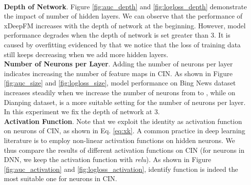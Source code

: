  \\\indent\textbf{Depth of Network}. Figure \ref{fig:auc_depth} and \ref{fig:logloss_depth} demonstrate the impact of number of hidden layers. We can observe that the performance of xDeepFM increases with the depth of network at the beginning. However, model performance degrades when the depth of network is set greater than 3. It is caused by overfitting evidenced by that we notice that the loss of training data still keeps decreasing when we add more hidden layers.
 \\\indent\textbf{Number of Neurons per Layer}. Adding the number of neurons per layer indicates increasing the number of feature maps in CIN. As shown in Figure \ref{fig:auc_size} and \ref{fig:logloss_size}, model performance on Bing News dataset increases steadily when we increase the number of neurons from  to , while on Dianping dataset,  is a more suitable setting for the number of neurons per layer. In this experiment we fix the depth of network at 3.
 \\\indent\textbf{Activation Function}. Note that we exploit the identity as activation function on neurons of CIN, as shown in Eq. \ref{eq:xk}. A common practice in deep learning literature is to employ non-linear activation functions on hidden neurons. We thus compare the results of different activation functions on CIN (for neurons in DNN, we keep the activation function with \textsl{relu}). As shown in Figure \ref{fig:auc_activation} and \ref{fig:logloss_activation}, identify function is indeed the most suitable one for neurons in CIN.